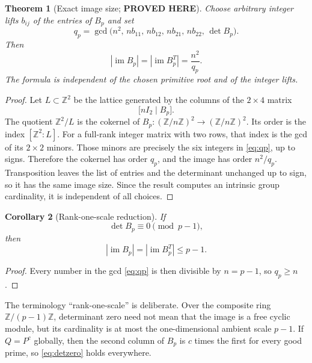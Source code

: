 \documentclass[11pt]{article}
\newtheorem{theorem}{Theorem}[section]
\newtheorem{corollary}[theorem]{Corollary}
\theoremstyle{definition}
\theoremstyle{remark}
\newcommand{\Z}{\mathbb Z}
\newcommand{\im}{\operatorname{im}}
\newcommand{\statusproved}{\textcolor{statusgreen}{\textbf{PROVED HERE}}}
\begin{document}
\begin{theorem}[Exact image size; \statusproved]\label{thm:image-size}
Choose arbitrary integer lifts $b_{ij}$ of the entries of $B_p$ and set
\begin{equation}\label{eq:qp}
q_p=\gcd\bigl(n^2,\,nb_{11},\,nb_{12},\,nb_{21},\,nb_{22},\,\det B_p\bigr).
\end{equation}
Then
\begin{equation}\label{eq:image-formula}
|\im B_p|=|\im B_p^T|=\frac{n^2}{q_p}.
\end{equation}
The formula is independent of the chosen primitive root and of the integer lifts.
\end{theorem}

\begin{proof}
Let $L\subset\Z^2$ be the lattice generated by the columns of the $2\times4$ matrix
\[
\bigl[nI_2\mid B_p\bigr].
\]
The quotient $\Z^2/L$ is the cokernel of $B_p:(\Z/n\Z)^2\to(\Z/n\Z)^2$.  Its order is the index $[\Z^2:L]$.  For a full-rank integer matrix with two rows, that index is the gcd of its $2\times2$ minors.  Those minors are precisely the six integers in \eqref{eq:qp}, up to signs.  Therefore the cokernel has order $q_p$, and the image has order $n^2/q_p$.  Transposition leaves the list of entries and the determinant unchanged up to sign, so it has the same image size.  Since the result computes an intrinsic group cardinality, it is independent of all choices.
\end{proof}

\begin{corollary}[Rank-one-scale reduction]\label{cor:rank-one-scale}
If
\begin{equation}\label{eq:detzero}
\det B_p\equiv0\pmod{p-1},
\end{equation}
then
\[
|\im B_p|=|\im B_p^T|\le p-1.
\]
\end{corollary}

\begin{proof}
Every number in the gcd \eqref{eq:qp} is then divisible by $n=p-1$, so $q_p\ge n$.
\end{proof}

The terminology ``rank-one-scale'' is deliberate.  Over the composite ring $\Z/(p-1)\Z$, determinant zero need not mean that the image is a free cyclic module, but its cardinality is at most the one-dimensional ambient scale $p-1$.  If $Q=P^c$ globally, then the second column of $B_p$ is $c$ times the first for every good prime, so \eqref{eq:detzero} holds everywhere.
\end{document}
